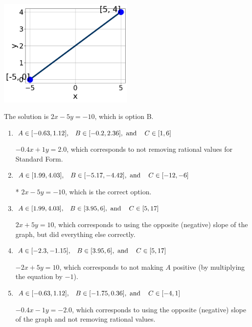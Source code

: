 \documentclass{extbook}[14pt]
\begin{document}
\begin{enumerate}
{\begin{center}
    \includegraphics[width=0.5\textwidth]{../Figures/linearGraphToStandardC.png}
\end{center}


The solution is \( 2x - 5y = -10 \), which is option B.\begin{enumerate}[label=\Alph*.]
\item \( A \in [-0.63, 1.12], \hspace{3mm} B \in [-0.2, 2.36], \text{ and } \hspace{3mm} C \in [1, 6] \)

 $-0.4x + 1y = 2.0$, which corresponds to not removing rational values for Standard Form.
\item \( A \in [1.99, 4.03], \hspace{3mm} B \in [-5.17, -4.42], \text{ and } \hspace{3mm} C \in [-12, -6] \)

* $2x - 5y = -10$, which is the correct option.
\item \( A \in [1.99, 4.03], \hspace{3mm} B \in [3.95, 6], \text{ and } \hspace{3mm} C \in [5, 17] \)

 $2x + 5y = 10$, which corresponds to using the opposite (negative) slope of the graph, but did everything else correctly.
\item \( A \in [-2.3, -1.15], \hspace{3mm} B \in [3.95, 6], \text{ and } \hspace{3mm} C \in [5, 17] \)

 $-2x + 5y = 10$, which corresponds to not making $A$ positive (by multiplying the equation by $-1$).
\item \( A \in [-0.63, 1.12], \hspace{3mm} B \in [-1.75, 0.36], \text{ and } \hspace{3mm} C \in [-4, 1] \)

 $-0.4x - 1y = -2.0$, which corresponds to using the opposite (negative) slope of the graph and not removing rational values.
\end{enumerate}

}
\end{enumerate}
\end{document}
